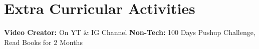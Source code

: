 \documentclass[letterpaper,11pt]{article}
\newcommand{\resumeItem}[2]{
  \item\small{
    \textbf{#1}{: #2 \vspace{-2pt}}
  }
}
\newcommand{\resumeSubItem}[2]{\resumeItem{#1}{#2}\vspace{-4pt}}
\newcommand{\resumeSubHeadingListStart}{\begin{itemize}[leftmargin=*]}
\newcommand{\resumeSubHeadingListEnd}{\end{itemize}}
\begin{document}
%
\section{Extra Curricular Activities}
     \textbf{Video Creator: }{On YT \& IG Channel}
     \hfill
     \textbf{Non-Tech: }{100 Days Pushup Challenge, Read Books for 2 Months}




\end{document}
